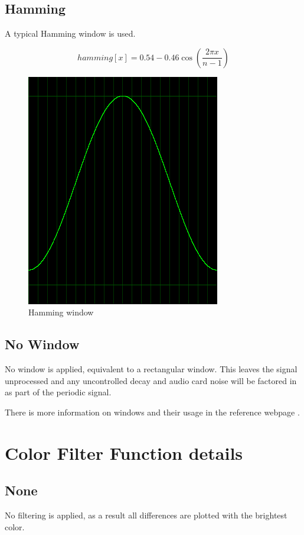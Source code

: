 \documentclass[10pt,a4paper]{report}
\begin{document}
\subsection{Hamming}
A typical Hamming window is used.

\begin{equation}
hamming[x] = 0.54 - 0.46\cos(\frac{2\pi x}{n-1})
\end{equation}

\begin{figure}[H]
	\centering
	\includegraphics[width=0.4\linewidth]{plots/window-hamming.png}
	\caption[Hamming window]{Hamming window}
	\label{fig:window-hamming}
\end{figure}


\subsection{No Window}

No window is applied, equivalent to a rectangular window. This leaves the signal unprocessed and any uncontrolled decay and audio card noise will be factored in as part of the periodic signal.

There is more information on windows and their usage in the reference webpage \cite{windowtypes}.

\section{Color Filter Function details}
\label{filterfunctions}

\subsection{None} 

No filtering is applied, as a result all differences are plotted with the brightest color. 
\end{document}
